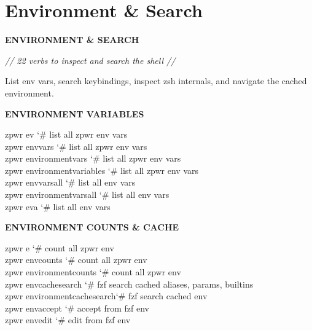 \documentclass[11pt,a4paper,twoside]{book}
\begin{document}
\section{Environment \& Search}


\vspace{10pt}
{\large\bfseries\color{neoncyan} ENVIRONMENT \& SEARCH}\vspace{6pt}

{\small\itshape\color{dimtext} // 22 verbs to inspect and search the shell //}

List env vars, search keybindings, inspect zsh internals, and navigate the cached environment.


\vspace{12pt}
{\bfseries\color{neonyellow} ENVIRONMENT VARIABLES}\vspace{4pt}

\begin{codebox}
\color{neongreen}zpwr ev                    {\char`\#} list all zpwr env vars\\
\color{neongreen}zpwr envvars               {\char`\#} list all zpwr env vars\\
\color{neongreen}zpwr environmentvars       {\char`\#} list all zpwr env vars\\
\color{neongreen}zpwr environmentvariables  {\char`\#} list all zpwr env vars\\
\color{neongreen}zpwr envvarsall            {\char`\#} list all env vars\\
\color{neongreen}zpwr environmentvarsall    {\char`\#} list all env vars\\
\color{neongreen}zpwr eva                   {\char`\#} list all env vars\\
\end{codebox}


\vspace{12pt}
{\bfseries\color{neonyellow} ENVIRONMENT COUNTS \& CACHE}\vspace{4pt}

\begin{codebox}
\color{neongreen}zpwr e                     {\char`\#} count all zpwr env\\
\color{neongreen}zpwr envcounts             {\char`\#} count all zpwr env\\
\color{neongreen}zpwr environmentcounts     {\char`\#} count all zpwr env\\
\color{neongreen}zpwr envcachesearch        {\char`\#} fzf search cached aliases, params, builtins\\
\color{neongreen}zpwr environmentcachesearch{\char`\#} fzf search cached env\\
\color{neongreen}zpwr envaccept             {\char`\#} accept from fzf env\\
\color{neongreen}zpwr envedit               {\char`\#} edit from fzf env\\
\end{codebox}
\end{document}
